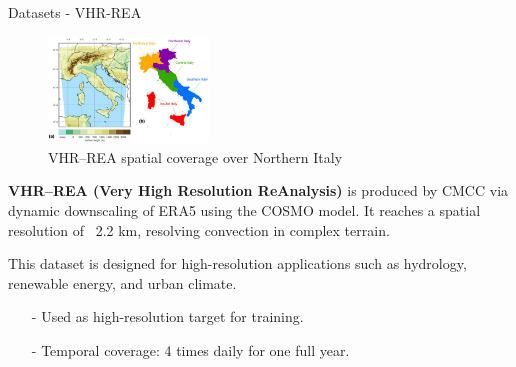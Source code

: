 \documentclass[footline=authortitle]{beamer}
\begin{document}
\begin{frame}{Datasets - VHR-REA}
\justifying
\scriptsize
\begin{figure}
    \centering
    \includegraphics[width=0.38\textwidth]{images/data-06-00088-g001-550.jpg}
    \caption{VHR--REA spatial coverage over Northern Italy}
\end{figure}

\textbf{VHR--REA (Very High Resolution ReAnalysis)} is produced by CMCC via dynamic downscaling of ERA5 using the COSMO model. It reaches a spatial resolution of ~2.2 km, resolving convection in complex terrain.

\vspace{0.5em}
This dataset is designed for high-resolution applications such as hydrology, renewable energy, and urban climate.

\vspace{0.5em}
\begin{itemize}
    \item[-] Used as high-resolution target for training.
    \item[-] Temporal coverage: 4 times daily for one full year.
\end{itemize}
\end{frame}
\end{document}

